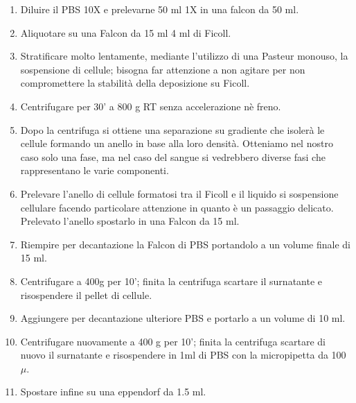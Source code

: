 \begin{enumerate}
    \item Diluire il PBS 10X e prelevarne 50 ml 1X in una falcon da 50 ml.
    \item Aliquotare su una Falcon da 15 ml 4 ml di Ficoll.
    \item Stratificare molto lentamente, mediante l'utilizzo di una Pasteur monouso,
    la sospensione di cellule; bisogna far attenzione a non agitare per non compromettere
    la stabilità della deposizione su Ficoll.
    \item Centrifugare per 30' a 800 g RT senza accelerazione nè freno.
    \item Dopo la centrifuga si ottiene una separazione su gradiente che isolerà le cellule
    formando un anello in base alla loro densità. Otteniamo nel nostro caso solo una fase,
    ma nel caso del sangue si vedrebbero diverse fasi che rappresentano le varie componenti.
    \item Prelevare l'anello di cellule formatosi tra il Ficoll e il liquido si sospensione
    cellulare facendo particolare attenzione in quanto è un passaggio delicato.
    Prelevato l'anello spostarlo in una Falcon da 15 ml.
    \item Riempire per decantazione la Falcon di PBS portandolo a un volume finale di 15 ml.
    \item Centrifugare a 400g per 10'; finita la centrifuga scartare il surnatante
    e risospendere il pellet di cellule.
    \item Aggiungere per decantazione ulteriore PBS e portarlo a un volume di 10 ml.
    \item Centrifugare nuovamente a 400 g per 10'; finita la centrifuga scartare di nuovo
    il surnatante e risospendere in 1ml di PBS con la micropipetta da 100 $\mu$.
    \item Spostare infine su una eppendorf da 1.5 ml.
\end{enumerate}

